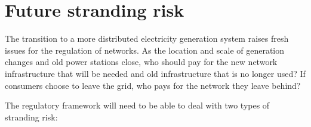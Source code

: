 \documentclass[FrontPage]{grattan}
\begin{document}




\section{Future stranding risk}\label{sec:future-stranding-risk}
The transition to a more distributed electricity generation system raises fresh issues for the regulation of networks. As the location and scale of generation changes and old power stations close, who should pay for the new network infrastructure that will be needed and old infrastructure that is no longer used? If consumers choose to leave the grid, who pays for the network they leave behind?

The regulatory framework will need to be able to deal with two types of stranding risk:
\end{document}
